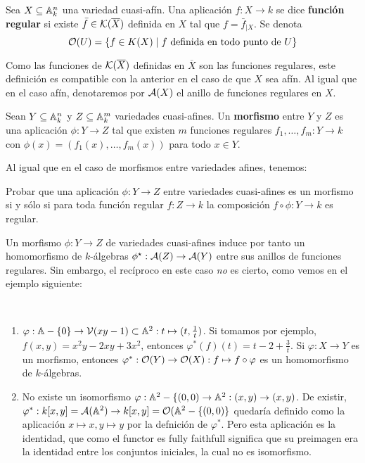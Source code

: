 \documentclass[ACGA.tex]{subfiles}
\begin{document}
\begin{defi}
 Sea $X\subseteq\mathbb{A}^n_k$ una variedad cuasi-afín. Una aplicación $f:X\to k$ se dice {\bf función regular} si existe $\bar f\in{\mathcal K}(\overline X)$ definida en $X$ tal que $f=\bar f_{|X}$. Se denota
$${\mathcal O}(U)=\{f\in K(X)\mid f\text{ definida en todo punto de } U\}$$
\end{defi}

Como las funciones de ${\mathcal K}(\overline X)$ definidas en $\overline X$ son las funciones regulares, este definición es compatible con la anterior en el caso de que $X$ sea afín. Al igual que en el caso afín, denotaremos por $\mathcal{A}(X)$ el anillo de funciones regulares en $X$.

\begin{defi}
 Sean $Y\subseteq\mathbb{A}^n_k$ y $Z\subseteq\mathbb{A}^m_k$ variedades cuasi-afines. Un {\bf morfismo} entre $Y$ y $Z$ es una aplicación $\phi:Y\to Z$ tal que existen $m$ funciones regulares $f_1,\ldots,f_m:Y\to k$ con $\phi(x)=(f_1(x),\ldots,f_m(x))$ para todo $x\in Y$.
\end{defi}

Al igual que en el caso de morfismos entre variedades afines, tenemos:
\begin{ejer}
 Probar que una aplicación $\phi:Y\to Z$ entre variedades cuasi-afines es un morfismo si y sólo si para toda función regular $f:Z\to k$ la composición $f\circ\phi:Y\to k$ es regular.
\end{ejer}

Un morfismo $\phi:Y\to Z$ de variedades cuasi-afines induce por tanto un homomorfismo de $k$-álgebras $\phi^\star:\mathcal{A}(Z)\to\mathcal{A}(Y)$ entre sus anillos de funciones regulares. Sin embargo, el recíproco en este caso \emph{no} es cierto, como vemos en el ejemplo siguiente:

\begin{ejs}\
\begin{enumerate}
\item $\varphi:\mathbb{A}-\{0\}\to\mathcal{V}(xy-1)\subset\mathbb{A}^2: t\mapsto (t,\frac{1}{t})$. Si tomamos por ejemplo, $f(x,y)=x^2y-2xy+3x^2$, entonces $\varphi^*(f)(t)=t-2+\frac{3}{t}$. Si $\varphi:X\to Y$ es un morfismo, entonces $\varphi^*:{\mathcal O}(Y)\to{\mathcal O}(X):f\mapsto f\circ\varphi$ es un homomorfismo de $k$-álgebras.
\item No existe un isomorfismo $\varphi:\mathbb{A}^2-\{(0,0)\to\mathbb{A}^2: (x,y)\to (x,y)$. De existir, $\varphi^*:k[x,y]=\mathcal{A}(\mathbb{A}^2)\to k[x,y]={\mathcal O}(\mathbb{A}^2-\{(0,0)\}$ quedaría definido como la aplicación $x\mapsto x, y\mapsto y$ por la defnición de $\varphi^*$. Pero esta aplicación es la identidad, que como el functor es fully faithfull significa que su preimagen era la identidad entre los conjuntos iniciales, la cual no es isomorfismo.

\end{enumerate}
\end{ejs}
\end{document}
